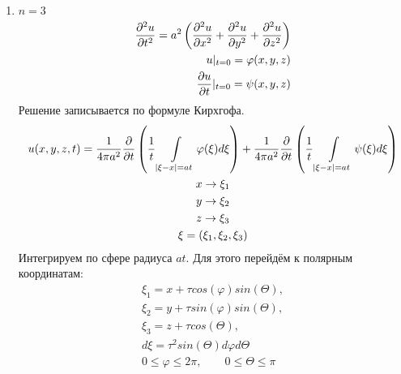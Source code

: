 \documentclass[../main.tex]{subfiles}
\begin{document}
\begin{enumerate}
\item $n=3$
\begin{equation}
    \label{eq:2.7.2}
    \begin{split}
    \frac{\partial ^2u}{\partial t^2} = a^2\left(\frac{\partial ^2u}{\partial x^2}+\frac{\partial ^2u}{\partial y^2}+\frac{\partial ^2u}{\partial z^2}\right)\\
    u|_{t=0} = \varphi(x,y,z)\\
    \frac{\partial u}{\partial t}|_{t=0} = \psi(x,y,z)
    \end{split}
\end{equation}
Решение записывается по формуле Кирхгофа.
\begin{gather*}
    u(x,y,z,t) = \frac{1}{4\pi a^2}\frac{\partial  }{\partial t}\left(
    \frac{1}{t}\int\displaylimits_{|\xi-x|=at} \varphi(\xi)d\xi\right)
    +
    \frac{1}{4\pi a^2}\frac{\partial  }{\partial t}\left(
    \frac{1}{t}\int\displaylimits_{|\xi-x|=at} \psi(\xi)d\xi\right)\\
    x \rightarrow \xi_1\\
    y \rightarrow \xi_2\\
    z \rightarrow \xi_3\\
    \xi = (\xi_1,\xi_2, \xi_3)
\end{gather*}
Интегрируем по сфере радиуса $at$. Для этого перейдём к
полярным координатам:
\begin{gather*}
    \xi_1 = x + \tau cos(\varphi) sin(\varTheta), \\
    \xi_2 = y + \tau sin(\varphi) sin(\varTheta),\\
    \xi_3 = z + \tau cos(\varTheta),\\
    d\xi = \tau^2 sin(\varTheta) d\varphi d\varTheta \\
    0 \leq \varphi \leq 2\pi, \qquad 0 \leq \varTheta \leq \pi
\end{gather*}
\end{enumerate}
\end{document}

